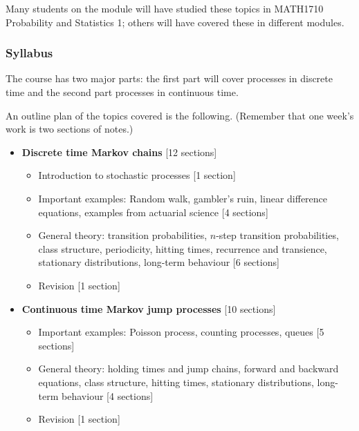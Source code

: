 \documentclass[
  a4paper,
]{article}
\providecommand{\tightlist}{%
  \setlength{\itemsep}{0pt}\setlength{\parskip}{0pt}}
\theoremstyle{definition}
\theoremstyle{definition}
\theoremstyle{definition}
\theoremstyle{remark}
\begin{document}
Many students on the module will have studied these topics in MATH1710 Probability and Statistics 1; others will have covered these in different modules.

\hypertarget{syllabus}{%
\subsubsection*{Syllabus}\label{syllabus}}

The course has two major parts: the first part will cover processes in discrete time and the second part processes in continuous time.

An outline plan of the topics covered is the following. (Remember that one week's work is two sections of notes.)

\begin{itemize}
\tightlist
\item
  \textbf{Discrete time Markov chains} {[}12 sections{]}

  \begin{itemize}
  \tightlist
  \item
    Introduction to stochastic processes {[}1 section{]}
  \item
    Important examples: Random walk, gambler's ruin, linear difference equations, examples from actuarial science {[}4 sections{]}
  \item
    General theory: transition probabilities, \(n\)-step transition probabilities, class structure, periodicity, hitting times, recurrence and transience, stationary distributions, long-term behaviour {[}6 sections{]}
  \item
    Revision {[}1 section{]}
  \end{itemize}
\item
  \textbf{Continuous time Markov jump processes} {[}10 sections{]}

  \begin{itemize}
  \tightlist
  \item
    Important examples: Poisson process, counting processes, queues {[}5 sections{]}
  \item
    General theory: holding times and jump chains, forward and backward equations, class structure, hitting times, stationary distributions, long-term behaviour {[}4 sections{]}
  \item
    Revision {[}1 section{]}
  \end{itemize}
\end{itemize}
\end{document}
